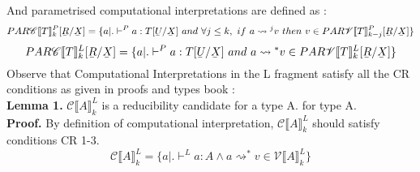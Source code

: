 \documentclass[12pt]{article}
\newcommand{\ub}[1]{\underaccent{\bar}{#1}}
\newcommand{\sgarr}{\ensuremath{\rightsquigarrow{}}\xspace}
\newcommand{\llrr}[1]{\llbracket {#1} \rrbracket}
\begin{document}
And parametrised computational interpretations are defined as :\\
$$
PAR\mathscr{C}\llrr{T}^P_k[\ub{R}/\ub{X}] = \{a | .\vdash^P
a:T[\ub{U}/\ub{X}]\ and\ \forall j \leq k,\ if\ a\sgarr^j v\ then\ v
\in PAR\mathscr{V}\llrr{T}^P_{k-j}[\ub{R}/\ub{X}]\}
$$
$$
PAR\mathscr{C}\llrr{T}^L_k[\ub{R}/\ub{X}] = \{a | .\vdash^P
a:T[\ub{U}/\ub{X}]\ and\ a \sgarr^{*} v
\in PAR\mathscr{V}\llrr{T}^L_k[\ub{R}/\ub{X}]\}
$$
Observe that Computational Interpretations in the L fragment satisfy
all the CR conditions as given in proofs and types book :\\

\textbf{Lemma 1.} $\mathscr{C}\llrr{A}^L_k$ is a reducibility
candidate for a type A.
for type A.\\
\textbf{Proof.} By definition of computational interpretation,
$\mathscr{C}\llrr{A}^L_k$ should satisfy conditions CR 1-3.\\
$$
\mathscr{C}\llrr{A}^L_k = \{a | . \vdash^L a:A \wedge a \sgarr^{*} v \in \mathscr{V}\llrr{A}^L_k\} 
$$
\end{document}
